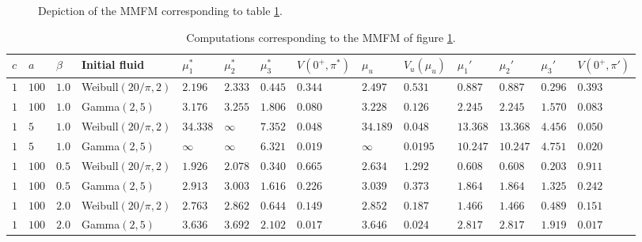 \begin{landscape}
\begin{figure}[H]
		\caption{Depiction of the MMFM corresponding to table \ref{table:MmfmComputations2}.}
		\label{figure:AppendixMmfm2}
	\end{figure}
\begin{table}[H]
\centering
\begin{tabularx}{\linewidth}{llllllllllllll}
	$c$& $a$ & $\beta$ & Initial fluid & $\mu_1^*$ & $\mu_2^*$ & $\mu_3^*$ & $V(0^+,\pi^*)$ & $\mu_u$ & $V_u(\mu_u)$ &$\mu_1'$ & $\mu_2'$ & $\mu_3'$ &$V(0^+,\pi')$  \\
	\hline    
	$1$ & $100$ & $1.0$ & Weibull$(20/\pi,2)$ & $2.196$ & $2.333$ & $0.445$ & $0.344$ & $2.497$ & $0.531$ & $0.887$ & $0.887$ & $0.296$ & $0.393$ \\ 
	$1$ & $100$ & $1.0$ & Gamma$(2,5)$ & $3.176$ & $3.255$ & $1.806$ & $0.080$ & $3.228$ & $0.126$ & $2.245$ & $2.245$ & $1.570$ & $0.083$ \\ 
	$1$ & $5$ & $1.0$ & Weibull$(20/\pi,2)$ & $34.338$ & $\infty$ & $7.352$ & $0.048$ & $34.189$ & $0.048$ & $13.368$ & $13.368$ & $4.456$ & $0.050$ \\ 
	$1$ & $5$ & $1.0$ & Gamma$(2,5)$ & $\infty$ & $\infty$ & $6.321$ & $0.019$ & $\infty$ & $0.0195$ & $10.247$ & $10.247$ & $4.751$ & $0.020$ \\ 
	$1$ & $100$ & $0.5$ & Weibull$(20/\pi,2)$ & $1.926$ & $2.078$ & $0.340$ & $0.665$ & $2.634$ & $1.292$ & $0.608$ & $0.608$ & $0.203$ & $0.911$ \\ 
	$1$ & $100$ & $0.5$ & Gamma$(2,5)$ & $2.913$ & $3.003$ & $1.616$ & $0.226$ & $3.039$ & $0.373$ & $1.864$ & $1.864$ & $1.325$ & $0.242$ \\ 
	$1$ & $100$ & $2.0$ & Weibull$(20/\pi,2)$ & $2.763$ & $2.862$ & $0.644$ & $0.149$ & $2.852$ & $0.187$ & $1.466$ & $1.466$ & $0.489$ & $0.151$ \\ 
	$1$ & $100$ & $2.0$ & Gamma$(2,5)$ & $3.636$ & $3.692$ & $2.102$ & $0.017$ & $3.646$ & $0.024$ & $2.817$ & $2.817$ & $1.919$ & $0.017$ \\ 
\end{tabularx}
\caption{Computations corresponding to the MMFM of figure \ref{figure:AppendixMmfm2}.}
\label{table:MmfmComputations2}
\end{table}
\end{landscape}